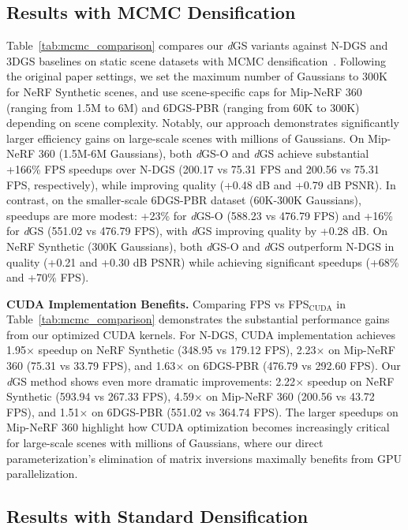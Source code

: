 \documentclass{article}
\newcommand{\modelname}{\textit{d}GS}
\theoremstyle{plain}
\theoremstyle{definition}
\theoremstyle{remark}
\begin{document}
\subsection{Results with MCMC Densification}

Table~\ref{tab:mcmc_comparison} compares our \modelname{} variants against N-DGS \cite{gao20246dgs} and 3DGS \cite{3dgs} baselines on static scene datasets with MCMC densification~\cite{kheradmand20243d}. Following the original paper settings, we set the maximum number of Gaussians to 300K for NeRF Synthetic scenes, and use scene-specific caps for Mip-NeRF 360 (ranging from 1.5M to 6M) and 6DGS-PBR (ranging from 60K to 300K) depending on scene complexity. Notably, our approach demonstrates significantly larger efficiency gains on large-scale scenes with millions of Gaussians. On Mip-NeRF 360 (1.5M-6M Gaussians), both \textit{d}GS-O and \textit{d}GS achieve substantial +166\% FPS speedups over N-DGS (200.17 vs 75.31 FPS and 200.56 vs 75.31 FPS, respectively), while improving quality (+0.48 dB and +0.79 dB PSNR). In contrast, on the smaller-scale 6DGS-PBR dataset (60K-300K Gaussians), speedups are more modest: +23\% for \textit{d}GS-O (588.23 vs 476.79 FPS) and +16\% for \textit{d}GS (551.02 vs 476.79 FPS), with \textit{d}GS improving quality by +0.28 dB. On NeRF Synthetic (300K Gaussians), both \textit{d}GS-O and \textit{d}GS outperform N-DGS in quality (+0.21 and +0.30 dB PSNR) while achieving significant speedups (+68\% and +70\% FPS).

\textbf{CUDA Implementation Benefits.} Comparing FPS vs FPS$_{\text{CUDA}}$ in Table~\ref{tab:mcmc_comparison} demonstrates the substantial performance gains from our optimized CUDA kernels. For N-DGS, CUDA implementation achieves 1.95$\times$ speedup on NeRF Synthetic (348.95 vs 179.12 FPS), 2.23$\times$ on Mip-NeRF 360 (75.31 vs 33.79 FPS), and 1.63$\times$ on 6DGS-PBR (476.79 vs 292.60 FPS). Our \textit{d}GS method shows even more dramatic improvements: 2.22$\times$ speedup on NeRF Synthetic (593.94 vs 267.33 FPS), 4.59$\times$ on Mip-NeRF 360 (200.56 vs 43.72 FPS), and 1.51$\times$ on 6DGS-PBR (551.02 vs 364.74 FPS). The larger speedups on Mip-NeRF 360 highlight how CUDA optimization becomes increasingly critical for large-scale scenes with millions of Gaussians, where our direct parameterization's elimination of matrix inversions maximally benefits from GPU parallelization.

\subsection{Results with Standard Densification}
\end{document}
